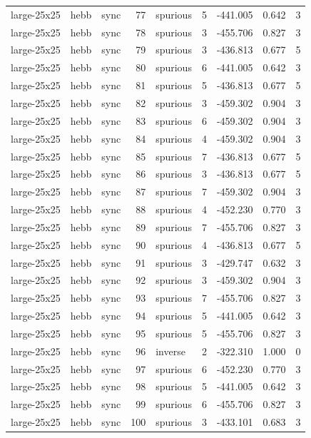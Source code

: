 \begin{tabular}{lllrlrrrr}
large-25x25 & hebb & sync & 77 & spurious & 5 & -441.005 & 0.642 & 3 \\
large-25x25 & hebb & sync & 78 & spurious & 3 & -455.706 & 0.827 & 3 \\
large-25x25 & hebb & sync & 79 & spurious & 3 & -436.813 & 0.677 & 5 \\
large-25x25 & hebb & sync & 80 & spurious & 6 & -441.005 & 0.642 & 3 \\
large-25x25 & hebb & sync & 81 & spurious & 5 & -436.813 & 0.677 & 5 \\
large-25x25 & hebb & sync & 82 & spurious & 3 & -459.302 & 0.904 & 3 \\
large-25x25 & hebb & sync & 83 & spurious & 6 & -459.302 & 0.904 & 3 \\
large-25x25 & hebb & sync & 84 & spurious & 4 & -459.302 & 0.904 & 3 \\
large-25x25 & hebb & sync & 85 & spurious & 7 & -436.813 & 0.677 & 5 \\
large-25x25 & hebb & sync & 86 & spurious & 3 & -436.813 & 0.677 & 5 \\
large-25x25 & hebb & sync & 87 & spurious & 7 & -459.302 & 0.904 & 3 \\
large-25x25 & hebb & sync & 88 & spurious & 4 & -452.230 & 0.770 & 3 \\
large-25x25 & hebb & sync & 89 & spurious & 7 & -455.706 & 0.827 & 3 \\
large-25x25 & hebb & sync & 90 & spurious & 4 & -436.813 & 0.677 & 5 \\
large-25x25 & hebb & sync & 91 & spurious & 3 & -429.747 & 0.632 & 3 \\
large-25x25 & hebb & sync & 92 & spurious & 3 & -459.302 & 0.904 & 3 \\
large-25x25 & hebb & sync & 93 & spurious & 7 & -455.706 & 0.827 & 3 \\
large-25x25 & hebb & sync & 94 & spurious & 5 & -441.005 & 0.642 & 3 \\
large-25x25 & hebb & sync & 95 & spurious & 5 & -455.706 & 0.827 & 3 \\
large-25x25 & hebb & sync & 96 & inverse & 2 & -322.310 & 1.000 & 0 \\
large-25x25 & hebb & sync & 97 & spurious & 6 & -452.230 & 0.770 & 3 \\
large-25x25 & hebb & sync & 98 & spurious & 5 & -441.005 & 0.642 & 3 \\
large-25x25 & hebb & sync & 99 & spurious & 6 & -455.706 & 0.827 & 3 \\
large-25x25 & hebb & sync & 100 & spurious & 3 & -433.101 & 0.683 & 3 \\

\end{tabular}
